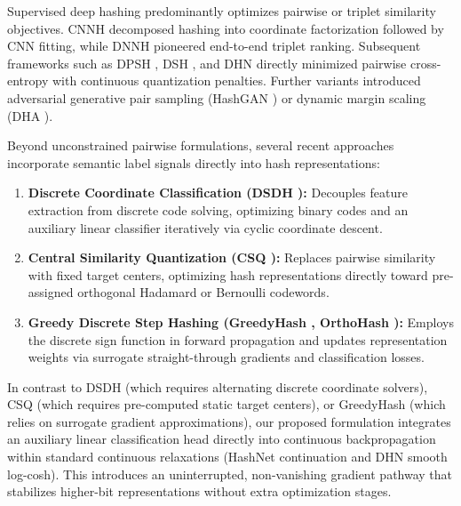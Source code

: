 \documentclass[10pt,conference]{IEEEtran}
\begin{document}
Supervised deep hashing predominantly optimizes pairwise or triplet similarity objectives. CNNH \cite{xia2014supervised} decomposed hashing into coordinate factorization followed by CNN fitting, while DNNH \cite{lai2015simultaneous} pioneered end-to-end triplet ranking. Subsequent frameworks such as DPSH \cite{li2015feature}, DSH \cite{liu2016deep}, and DHN \cite{zhu2016deep} directly minimized pairwise cross-entropy with continuous quantization penalties. Further variants introduced adversarial generative pair sampling (HashGAN \cite{dizaji2018hashgan}) or dynamic margin scaling (DHA \cite{xu2019dha}). 

Beyond unconstrained pairwise formulations, several recent approaches incorporate semantic label signals directly into hash representations:
\begin{enumerate}
    \item \textbf{Discrete Coordinate Classification (DSDH \cite{li2017deep}):} Decouples feature extraction from discrete code solving, optimizing binary codes and an auxiliary linear classifier iteratively via cyclic coordinate descent.
    \item \textbf{Central Similarity Quantization (CSQ \cite{yuan2020central_similarity}):} Replaces pairwise similarity with fixed target centers, optimizing hash representations directly toward pre-assigned orthogonal Hadamard or Bernoulli codewords.
    \item \textbf{Greedy Discrete Step Hashing (GreedyHash \cite{su2021greedyhash}, OrthoHash \cite{sun2021orthohash}):} Employs the discrete sign function in forward propagation and updates representation weights via surrogate straight-through gradients and classification losses.
\end{enumerate}
In contrast to DSDH (which requires alternating discrete coordinate solvers), CSQ (which requires pre-computed static target centers), or GreedyHash (which relies on surrogate gradient approximations), our proposed formulation integrates an auxiliary linear classification head directly into continuous backpropagation within standard continuous relaxations (HashNet continuation and DHN smooth log-cosh). This introduces an uninterrupted, non-vanishing gradient pathway that stabilizes higher-bit representations without extra optimization stages.
\end{document}

